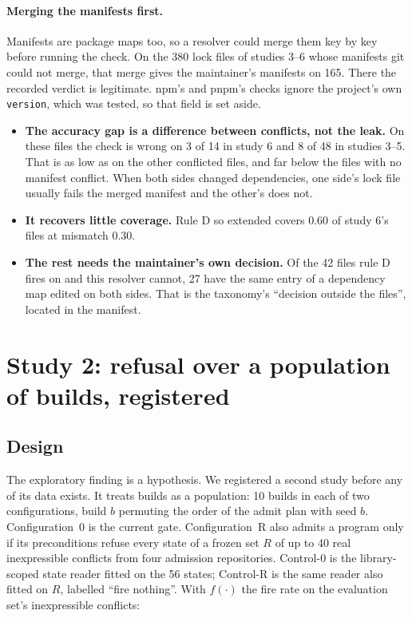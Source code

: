 \documentclass[11pt]{article}
\newcommand{\code}[1]{\texttt{#1}}
\begin{document}
\paragraph{Merging the manifests first.}
Manifests are package maps too, so a resolver could merge them key by key before running the
check. On the 380 lock files of studies 3--6 whose manifests git could not merge, that merge
gives the maintainer's manifests on 165. There the recorded verdict is legitimate. npm's and
pnpm's checks ignore the project's own \code{version}, which was tested, so that field is set
aside.
\begin{itemize}
  \item \textbf{The accuracy gap is a difference between conflicts, not the leak.} On these
  files the check is wrong on 3 of 14 in study 6 and 8 of 48 in studies 3--5. That is as low as
  on the other conflicted files, and far below the files with no manifest conflict. When both
  sides changed dependencies, one side's lock file usually fails the merged manifest and the
  other's does not.
  \item \textbf{It recovers little coverage.} Rule D so extended covers 0.60 of study 6's files
  at mismatch 0.30.
  \item \textbf{The rest needs the maintainer's own decision.} Of the 42 files rule D fires on
  and this resolver cannot, 27 have the same entry of a dependency map edited on both sides.
  That is the taxonomy's ``decision outside the files'', located in the manifest.
\end{itemize}

\section{Study 2: refusal over a population of builds, registered}
\label{sec:power}

\subsection{Design}

The exploratory finding is a hypothesis. We registered a second study before any of its data
exists. It treats builds as a population: 10 builds in each of two configurations, build $b$
permuting the order of the admit plan with seed $b$. Configuration~0 is the current gate.
Configuration~R also admits a program only if its preconditions refuse every state of a frozen set
$R$ of up to 40 real inexpressible conflicts from four admission repositories. Control-0 is the
library-scoped state reader fitted on the 56 states; Control-R is the same reader also fitted on
$R$, labelled ``fire nothing''. With $f(\cdot)$ the fire rate on the evaluation set's
inexpressible conflicts:
\end{document}
